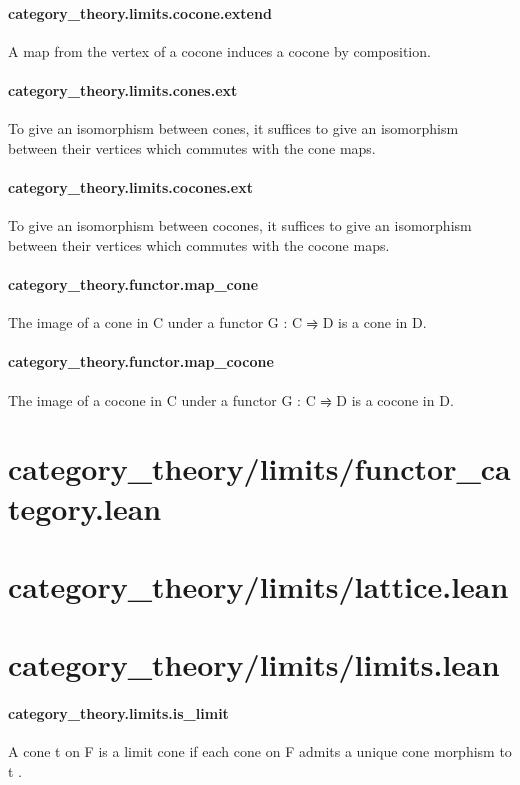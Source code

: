\documentclass{article}
\begin{document}
\paragraph{category\_theory.limits.cocone.extend}
\par
A map from the vertex of a cocone induces a cocone by composition.
\paragraph{category\_theory.limits.cones.ext}
\par
To give an isomorphism between cones, it suffices to give an
isomorphism between their vertices which commutes with the cone
maps.
\paragraph{category\_theory.limits.cocones.ext}
\par
To give an isomorphism between cocones, it suffices to give an
isomorphism between their vertices which commutes with the cocone
maps.
\paragraph{category\_theory.functor.map\_cone}
\par
The image of a cone in C under a functor G : C ⥤ D is a cone in D.
\paragraph{category\_theory.functor.map\_cocone}
\par
The image of a cocone in C under a functor G : C ⥤ D is a cocone in D.
\section{category\_theory/limits/functor\_category.lean}\section{category\_theory/limits/lattice.lean}\section{category\_theory/limits/limits.lean}\paragraph{category\_theory.limits.is\_limit}
\par
A cone 
\colorbox[RGB]{253,246,227}{{{{\color[RGB]{101, 123, 131} t }}}} on 
\colorbox[RGB]{253,246,227}{{{{\color[RGB]{101, 123, 131} F }}}} is a limit cone if each cone on 
\colorbox[RGB]{253,246,227}{{{{\color[RGB]{101, 123, 131} F }}}} admits a unique
cone morphism to 
\colorbox[RGB]{253,246,227}{{{{\color[RGB]{101, 123, 131} t }}}}.
\end{document}
